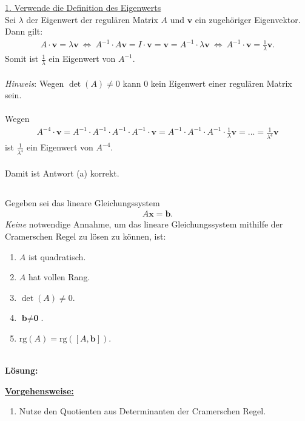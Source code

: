 \underline{1. Verwende die Definition des Eigenwerts}\\
Sei $ \lambda  $ der Eigenwert der regulären Matrix $ A $ und $ \textbf{v} $ ein zugehöriger Eigenvektor. Dann gilt:
\begin{align*}
	A \cdot  \textbf{v} = \lambda \textbf{v}
	\ \Leftrightarrow \
	A^{-1} \cdot A \textbf{v} = I \cdot \textbf{v} = \textbf{v} = A^{-1} \cdot \lambda \textbf{v}
	\ \Leftrightarrow \
	A^{-1} \cdot \textbf{v} = \frac{1}{\lambda} \textbf{v}.
\end{align*} 
Somit ist $ \frac{1}{\lambda} $ ein Eigenwert von $ A^{-1} $.\\
\\
\textit{Hinweis}: Wegen $ \det(A) \neq  0 $ kann $ 0 $ kein Eigenwert einer regulären Matrix sein.\\
\\
Wegen
\begin{align*}
	A^{-4} \cdot \textbf{v} 
	= 
	A^{-1} \cdot A^{-1} \cdot A^{-1} \cdot A^{-1} \cdot  \textbf{v}
	=
	A^{-1} \cdot A^{-1} \cdot A^{-1} \cdot \frac{1}{\lambda} \textbf{v}
	=
	...
	=
	\frac{1}{\lambda^4} \textbf{v}  
\end{align*}
ist $ \frac{1}{\lambda^4} $ ein Eigenwert von $ A^{-4} $.\\
\\
Damit ist Antwort (a) korrekt.


\newpage
\subsection*{}
Gegeben sei das lineare Gleichungssystem
\begin{align*}
	A \textbf{x} = \textbf{b}.
\end{align*}
\textit{Keine} notwendige Annahme, um das lineare Gleichungssystem mithilfe der Cramerschen Regel zu lösen zu können, ist:
\renewcommand{\labelenumi}{(\alph{enumi})}
\begin{enumerate}
	\item 
	$ A $ ist quadratisch.
	\item
	$ A $ hat vollen Rang.
	\item
	$ \det(A) \neq 0$.
	\item
	$ \textbf{b} \neq \textbf{0} $.
	\item
	$ \mathrm{rg}(A) = \mathrm{rg}([A,\textbf{b}])$.
\end{enumerate}
\ \\
\textbf{Lösung:}
\begin{mdframed}
\underline{\textbf{Vorgehensweise:}}
\renewcommand{\labelenumi}{\theenumi.}
\begin{enumerate}
\item Nutze den Quotienten aus Determinanten der Cramerschen Regel.
\end{enumerate}
\end{mdframed}

